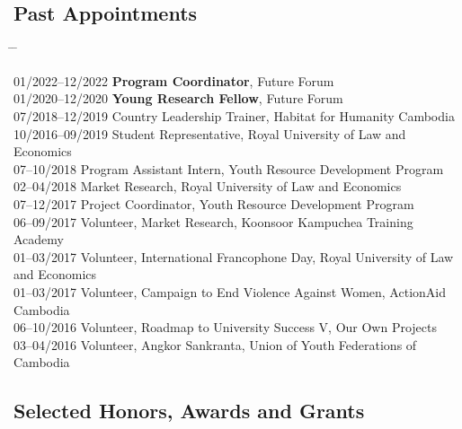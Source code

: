 \documentclass[10pt,a4paper]{article}
\newcommand{\tabbedblock}[1]{

	\begin{tabbing}
		\hspace{3cm} \= \hspace{4cm} \= \kill
		#1
	\end{tabbing}
}
\begin{document}
\subsection*{Past Appointments}

\tabbedblock{
	
	01/2022--12/2022 \> \textbf{Program Coordinator}, Future Forum \\
	
	01/2020--12/2020 \> \textbf{Young Research Fellow}, Future Forum \\

	07/2018--12/2019 \> Country Leadership Trainer, Habitat for Humanity Cambodia\\
		
	10/2016--09/2019 \> Student Representative, Royal University of Law and Economics\\

	07--10/2018 \> Program Assistant Intern, Youth Resource Development Program\\

	02--04/2018 \> Market Research, Royal University of Law and Economics\\

	07--12/2017 \> Project Coordinator, Youth Resource Development Program\\ 

	06--09/2017 \> Volunteer, Market Research, Koonsoor Kampuchea Training Academy\\

	01--03/2017 \> Volunteer, International Francophone Day,  Royal University of Law and Economics\\

	01--03/2017 \> Volunteer, Campaign to End Violence Against Women, ActionAid Cambodia\\

	06--10/2016 \> Volunteer, Roadmap to University Success V, Our Own Projects\\

	03--04/2016 \> Volunteer, Angkor Sankranta, Union of Youth Federations of Cambodia
}

\subsection*{Selected Honors, Awards and Grants}
\end{document}
